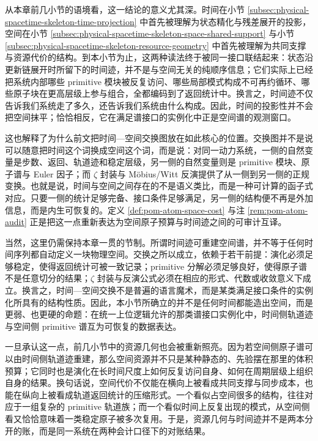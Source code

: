 从本章前几小节的语境看，这一结论的意义尤其深。时间在小节 \ref{subsec:physical-spacetime-skeleton-time-projection} 中首先被理解为状态精化与残差展开的投影，空间在小节 \ref{subsec:physical-spacetime-skeleton-space-shared-support} 与小节 \ref{subsec:physical-spacetime-skeleton-resource-geometry} 中首先被理解为共同支撑与资源代价的结构。到本小节为止，这两种读法终于被同一接口联结起来：状态沿更新链展开时所留下的时间迹，并不是与空间无关的纯顺序信息；它们实际上已经把系统内部哪些 primitive 模块被反复访问、哪些局部模式构成不可再约循环、哪些原子块在更高层级上参与组合，全都编码到了返回统计中。换言之，时间迹不仅告诉我们系统走了多久，还告诉我们系统由什么构成。因此，时间的投影性并不会把空间抹平；恰恰相反，它在满足谱接口的实例化中正是空间谱的观测窗口。

这也解释了为什么前文把时间—空间交换图放在如此核心的位置。交换图并不是说可以随意把时间这个词换成空间这个词，而是说：对同一动力系统，一侧的自然变量是步数、返回、轨道迹和稳定层级，另一侧的自然变量则是 primitive 模块、原子谱与 Euler 因子；而 \(\zeta\) 封装与 Möbius/Witt 反演提供了从一侧到另一侧的正规变换。也就是说，时间与空间之间存在的不是语义类比，而是一种可计算的函子式对应。只要一侧的统计足够完备、接口条件足够满足，另一侧的结构便不再是外加信息，而是内生可恢复的。定义 \ref{def:pom-atom-space-cost} 与注 \ref{rem:pom-atom-audit} 正是把这一点重新表达为空间原子预算与时间迹之间的可审计互译。

当然，这里仍需保持本章一贯的节制。所谓时间迹可重建空间谱，并不等于任何时间序列都自动定义一块物理空间。交换之所以成立，依赖于若干前提：演化必须足够稳定，使得返回统计可被一致记录；primitive 分解必须足够良好，使得原子谱不是任意切分的结果；\(\zeta\) 封装与反演公式必须在相应的形式、代数或收敛意义下成立。换言之，时间—空间交换不是普遍的语言魔术，而是某类满足接口条件的实例化所具有的结构性质。因此，本小节所确立的并不是任何时间都能造出空间，而是更弱、也更硬的命题：在统一上位逻辑允许的那类谱接口实例化中，时间侧轨道迹与空间侧 primitive 谱互为可恢复的数据表达。

一旦承认这一点，前几小节中的资源几何也会被重新照亮。因为若空间侧原子谱可以由时间侧轨道迹重建，那么空间资源并不只是某种静态的、先验摆在那里的体积预算；它同时也是演化在长时间尺度上如何反复访问自身、如何在周期层级上组织自身的结果。换句话说，空间代价不仅能在横向上被看成共同支撑与同步成本，也能在纵向上被看成轨道返回统计的压缩形式。一个看似占空间很多的结构，往往对应于一组复杂的 primitive 轨道族；而一个看似时间上反复出现的模式，从空间侧看又恰恰意味着一类稳定原子被多次复用。于是，资源几何与时间迹并不是两本分开的账，而是同一系统在两种会计口径下的对账结果。


